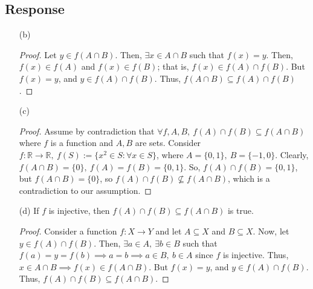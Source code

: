 \documentclass[13pt]{article}
\begin{document}
\subsection*{Response}
\begin{enumerate}
\item [(b)]
  \begin{proof}
    Let $y \in f(A \cap B)$. Then, $\exists x \in A \cap B$ such that $f(x) = y$. Then, $f(x) \in f(A)$ and
    $f(x) \in f(B)$; that is, $f(x) \in f(A) \cap f(B)$. But $f(x) = y$, and $y \in f(A) \cap f(B)$. Thus, $f(A
    \cap B) \subseteq f(A) \cap f(B)$.
  \end{proof}

\item [(c)]
  \begin{proof}
    Assume by contradiction that $\forall f, A, B, \ f(A) \cap f(B) \subseteq f(A \cap B)$ where $f$ is a function and $A, B$ are sets.
    Consider $f : \mathbb{R} \rightarrow \mathbb{R}, \ f(S) := \{x^2 \in S : \forall x \in S\}$,
    where $A = \{0, 1\}, \ B = \{-1, 0\}$.
    Clearly, $f(A \cap B) = \{0\}, \ f(A) = f(B) = \{0, 1\}$. So, $f(A) \cap f(B) = \{0, 1\}$, but
    $f(A \cap B) = \{0\}$, so $f(A) \cap f(B) \not \subseteq f(A \cap B)$,
    which is a contradiction to our assumption.
  \end{proof}

\item [(d)] If $f$ is injective, then $f(A) \cap f(B) \subseteq f(A \cap B)$ is true.
  \begin{proof}
    Consider a function $f : X \rightarrow Y$ and let $A \subseteq X$ and $B \subseteq X$. Now, let $y \in
    f(A) \cap f(B)$. Then, $\exists a \in A, \ \exists b \in B$ such that $f(a) = y = f(b) \implies a = b
    \implies  a \in B, \ b \in A$ since $f$ is injective. Thus, $x \in A \cap B \implies f(x) \in f(A \cap B)$.
    But $f(x) = y$, and $y \in f(A) \cap f(B)$. Thus, $f(A) \cap f(B) \subseteq f(A \cap B)$.
  \end{proof}
\end{enumerate}






\newpage
\end{document}
